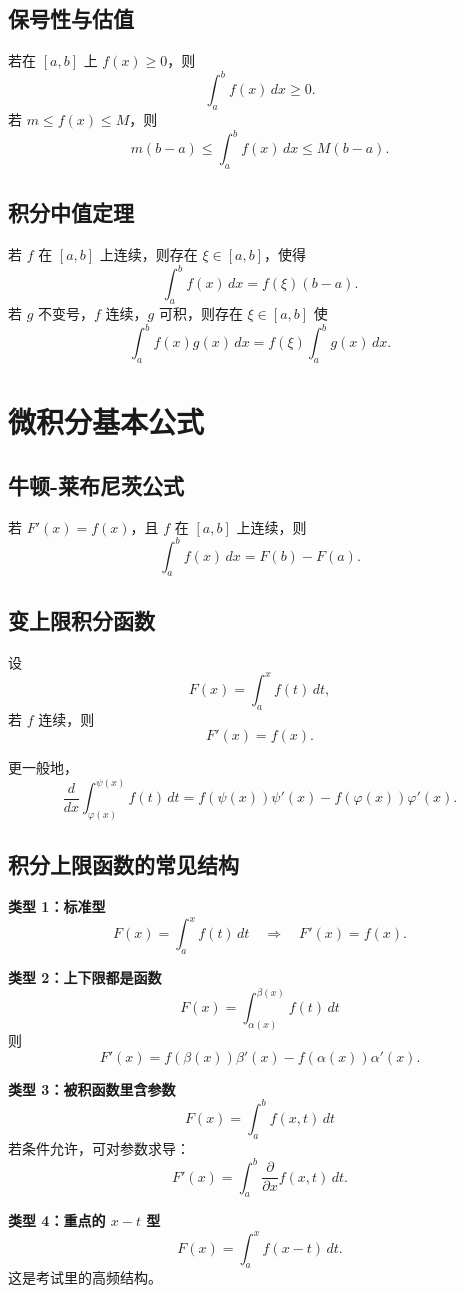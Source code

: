 \documentclass[12pt,a4paper]{ctexart}
\begin{document}
\subsection{保号性与估值}
若在 $[a,b]$ 上 $f(x)\ge 0$，则
\[
\int_a^b f(x)\,dx\ge 0.
\]
若 $m\le f(x)\le M$，则
\[
m(b-a)\le \int_a^b f(x)\,dx\le M(b-a).
\]

\subsection{积分中值定理}
若 $f$ 在 $[a,b]$ 上连续，则存在 $\xi\in[a,b]$，使得
\[
\int_a^b f(x)\,dx=f(\xi)(b-a).
\]
若 $g$ 不变号，$f$ 连续，$g$ 可积，则存在 $\xi\in[a,b]$ 使
\[
\int_a^b f(x)g(x)\,dx=f(\xi)\int_a^b g(x)\,dx.
\]

\section{微积分基本公式}

\subsection{牛顿-莱布尼茨公式}
若 $F'(x)=f(x)$，且 $f$ 在 $[a,b]$ 上连续，则
\[
\int_a^b f(x)\,dx=F(b)-F(a).
\]

\subsection{变上限积分函数}
设
\[
F(x)=\int_a^x f(t)\,dt,
\]
若 $f$ 连续，则
\[
F'(x)=f(x).
\]

更一般地，
\[
\frac{d}{dx}\int_{\varphi(x)}^{\psi(x)}f(t)\,dt
=
f(\psi(x))\psi'(x)-f(\varphi(x))\varphi'(x).
\]

\subsection{积分上限函数的常见结构}

\textbf{类型 1：标准型}
\[
F(x)=\int_a^x f(t)\,dt
\quad\Longrightarrow\quad
F'(x)=f(x).
\]

\textbf{类型 2：上下限都是函数}
\[
F(x)=\int_{\alpha(x)}^{\beta(x)} f(t)\,dt
\]
则
\[
F'(x)=f(\beta(x))\beta'(x)-f(\alpha(x))\alpha'(x).
\]

\textbf{类型 3：被积函数里含参数}
\[
F(x)=\int_a^b f(x,t)\,dt
\]
若条件允许，可对参数求导：
\[
F'(x)=\int_a^b \frac{\partial}{\partial x}f(x,t)\,dt.
\]

\textbf{类型 4：重点的 $x-t$ 型}
\[
F(x)=\int_a^x f(x-t)\,dt.
\]
这是考试里的高频结构。
\end{document}
